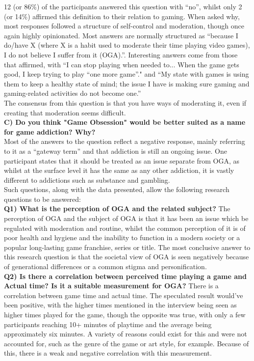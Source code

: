 \documentclass[conference]{IEEEtran}
\begin{document}
12 (or 86\%) of the participants answered this question with “no”, whilst only 2 (or 14\%) affirmed this definition to their relation to gaming. When asked why, most responses followed a structure of self-control and moderation, though once again highly opinionated. Most answers are normally structured as “because I do/have X (where X is a habit used to moderate their time playing video games), I do not believe I suffer from it (OGA).”. Interesting answers come from those that affirmed, with “I can stop playing when needed to... When the game gets good, I keep trying to play “one more game”." and “My state with games is using them to keep a healthy state of mind; the issue I have is making sure gaming and gaming-related activities do not become one.”\\ 

The consensus from this question is that you have ways of moderating it, even if creating that moderation seems difficult.\\

 \textbf{C) Do you think "Game Obsession" would be better suited as a name for game addiction? Why?}\\

Most of the answers to the question reflect a negative response, mainly referring to it as a “gateway term” and that addiction is still an ongoing issue. One participant states that it should be treated as an issue separate from OGA, as whilst at the surface level it has the same as any other addiction, it is vastly different to addictions such as substance and gambling.\\

Such questions, along with the data presented, allow the following research questions to be answered:\\

 \textbf{Q1)  What is the perception of OGA and the related subject?}
The perception of OGA and the subject of OGA is that it has been an issue which be regulated with moderation and routine, whilst the common perception of it is of poor health and hygiene and the inability to function in a modern society or a popular long-lasting game franchise, series or title. The most conclusive answer to this research question is that the societal view of OGA is seen negatively because of generational differences or a common stigma and personification.\\

 \textbf{Q2) Is there a correlation between perceived time playing a game and Actual time? Is it a suitable measurement for OGA?}
There is a correlation between game time and actual time. The speculated result would’ve been positive, with the higher times mentioned in the interview being seen as higher times played for the game, though the opposite was true, with only a few participants reaching 10+ minutes of playtime and the average being approximately six minutes. A variety of reasons could exist for this and were not accounted for, such as the genre of the game or art style, for example. Because of this, there is a weak and negative correlation with this measurement.
\end{document}
